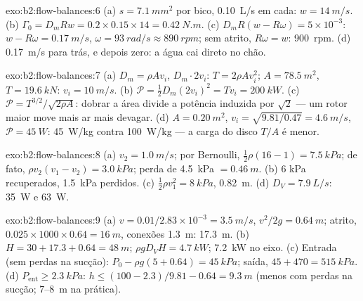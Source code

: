 \begin{solution}{exo:b2:flow-balances:6}
(a) $s = \qty{7.1}{mm^2}$ por bico, \qty{0.10}{L/s} em cada: $w = \qty{14}{m/s}$. (b)
$\Gamma_0 = D_mRw = 0.2 \times 0.15 \times 14 = \qty{0.42}{N.m}$. (c) $D_mR(w - R\omega) =
5 \times 10^{-3}$: $w - R\omega = \qty{0.17}{m/s}$, $\omega = \qty{93}{rad/s} \approx \qty{890}{rpm}$;
sem atrito, $R\omega = w$: \qty{900}{rpm}. (d) \qty{0.17}{m/s} para trás, e depois
zero: a água cai direto no chão.
\end{solution}

\begin{solution}{exo:b2:flow-balances:7}
(a) $D_m = \rho Av_i$,  $D_m\cdot2v_i$: $T = 2\rho Av_i^2$; $A = \qty{78.5}{m^2}$,
$T = \qty{19.6}{kN}$: $v_i = \qty{10}{m/s}$. (b) $\mathcal P = \tfrac12D_m(2v_i)^2 = Tv_i =
\qty{200}{kW}$. (c) $\mathcal P = T^{3/2}/\sqrt{2\rho A}$: dobrar a área
divide a potência induzida por $\sqrt2$ --- um rotor maior move mais ar
mais devagar. (d) $A = \qty{0.20}{m^2}$, $v_i = \sqrt{9.81/0.47} = \qty{4.6}{m/s}$, $\mathcal P
= \qty{45}{W}$: \qty{45}{W/kg} contra \qty{100}{W/kg} --- a carga do disco $T/A$
é menor.
\end{solution}

\begin{solution}{exo:b2:flow-balances:8}
(a) $v_2 = \qty{1.0}{m/s}$; por Bernoulli, $\tfrac12\rho(16 - 1) = \qty{7.5}{kPa}$; de fato,
$\rho v_2(v_1 - v_2) = \qty{3.0}{kPa}$; perda de \qty{4.5}{kPa} $= \qty{0.46}{m}$. (b) $6$ kPa
recuperados, \qty{1.5}{kPa} perdidos. (c) $\tfrac12\rho v_1^2 = \qty{8}{kPa}$, \qty{0.82}{m}. (d)
$D_V = \qty{7.9}{L/s}$: \qty{35}{W} e \qty{63}{W}.
\end{solution}

\begin{solution}{exo:b2:flow-balances:9}
(a) $v = 0.01/2.83 \times 10^{-3} = \qty{3.5}{m/s}$, $v^2/2g = \qty{0.64}{m}$; atrito,
$0.025 \times 1000 \times 0.64 = \qty{16}{m}$, conexões \qty{1.3}{m}: \qty{17.3}{m}. (b)
$H = 30 + 17.3 + 0.64 = \qty{48}{m}$; $\rho gD_VH = \qty{4.7}{kW}$; \qty{7.2}{kW} no
eixo. (c) Entrada (sem perdas na sucção): $P_0 - \rho g(5 + 0.64) = \qty{45}{kPa}$;
saída, $45 + 470 = \qty{515}{kPa}$. (d) $P_{\text{ent}} \ge \qty{2.3}{kPa}$: $h \le (100 -
2.3)/9.81 - 0.64 = \qty{9.3}{m}$ (menos com perdas na sucção; $7$--\qty{8}{m} na
prática).
\end{solution}

